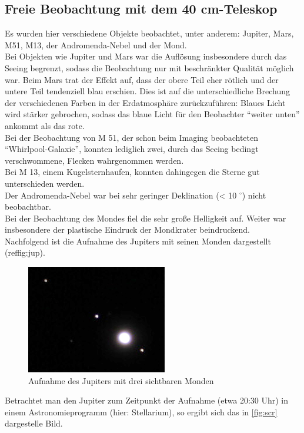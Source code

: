 \subsection{Freie Beobachtung mit dem 40 cm-Teleskop}
Es wurden hier verschiedene Objekte beobachtet, unter anderem: Jupiter, Mars, M51, M13, der Andromenda-Nebel und der Mond. \\
Bei Objekten wie Jupiter und Mars war die Auflösung insbesondere durch das Seeing begrenzt, sodass die Beobachtung nur mit beschränkter Qualität möglich war. Beim Mars trat der Effekt auf, dass der obere Teil eher rötlich und der untere Teil tendenziell blau erschien. Dies ist auf die unterschiedliche Brechung der verschiedenen Farben in der Erdatmosphäre zurückzuführen: Blaues Licht wird stärker gebrochen, sodass das blaue Licht für den Beobachter \enquote{weiter unten} ankommt als das rote. \\
Bei der Beobachtung von M 51, der schon beim Imaging beobachteten \enquote{Whirlpool-Galaxie}, konnten lediglich zwei, durch das Seeing bedingt verschwommene, Flecken wahrgenommen werden. \\
Bei M 13, einem Kugelsternhaufen, konnten dahingegen die Sterne gut unterschieden werden. \\
Der Andromenda-Nebel war bei sehr geringer Deklination (< 10 $^\circ$) nicht beobachtbar. \\
Bei der Beobachtung des Mondes fiel die sehr große Helligkeit auf. Weiter war insbesondere der plastische Eindruck der Mondkrater beindruckend. \\
Nachfolgend ist die Aufnahme des Jupiters mit seinen Monden dargestellt (ref{fig:jup}).
\begin{figure}[h!]
\centering
        \includegraphics[width=.4\textwidth]{img_jup.png}
\caption{ Aufnahme des Jupiters mit drei sichtbaren Monden }
\label{fig:jup}
\end{figure}

Betrachtet man den Jupiter zum Zeitpunkt der Aufnahme (etwa 20:30 Uhr) in einem Astronomieprogramm (hier: Stellarium), so ergibt sich das in \ref{fig:scr} dargestelle Bild. 

